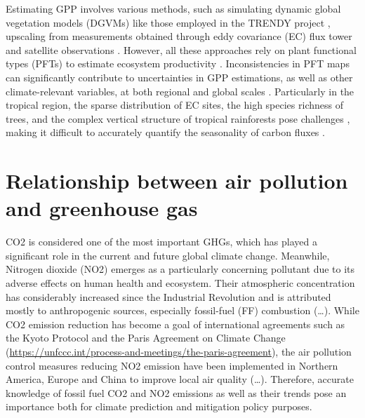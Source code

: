 Estimating GPP involves various methods, such as simulating dynamic global vegetation models (DGVMs) like those employed in the TRENDY project \citep{sitch2015recent, le2018global}, upscaling from measurements obtained through eddy covariance (EC) flux tower and satellite observations \citep{jung2019fluxcom, zeng2020global}. However, all these approaches rely on plant functional types (PFTs) to estimate ecosystem productivity \citep{poulter2011plant, poulter2015plant, lin2021improved, guo2023estimating, yan2023integrating}. Inconsistencies in PFT maps can significantly contribute to uncertainties in GPP estimations, as well as other climate-relevant variables, at both regional and global scales \citep{poulter2011plant}. Particularly in the tropical region, the sparse distribution of EC sites, the high species richness of trees, and the complex vertical structure of tropical rainforests pose challenges \citep{montgomery2001forest}, making it difficult to accurately quantify the seasonality of carbon fluxes \citep{xu2015satellite}. \par

\section{Relationship between air pollution and greenhouse gas}
CO2 is considered one of the most important GHGs, which has played a significant role in the current and future global climate change. Meanwhile, Nitrogen dioxide (NO2) emerges as a particularly concerning pollutant due to its adverse effects on human health and ecosystem. Their atmospheric concentration has considerably increased since the Industrial Revolution and is attributed mostly to anthropogenic sources, especially fossil-fuel (FF) combustion (…). While CO2 emission reduction has become a goal of international agreements such as the Kyoto Protocol \citep{protocol1997united} and the Paris Agreement on Climate Change (\url{https://unfccc.int/process-and-meetings/the-paris-agreement}), the air pollution control measures reducing NO2 emission have been implemented in Northern America, Europe and China to improve local air quality (…). Therefore, accurate knowledge of fossil fuel CO2 and NO2 emissions as well as their trends pose an importance both for climate prediction and mitigation policy purposes. \par

